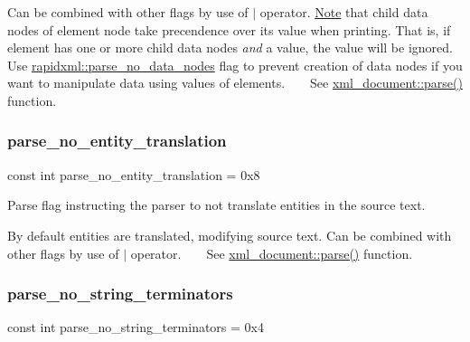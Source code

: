 Can be combined with other flags by use of $\vert$ operator. \mbox{\hyperlink{classNote}{Note}} that child data nodes of element node take precendence over its value when printing. That is, if element has one or more child data nodes {\itshape and} a value, the value will be ignored. Use \mbox{\hyperlink{namespacerapidxml_a87e8bbab53702cf3b438bd553c10b6b9}{rapidxml\+::parse\+\_\+no\+\_\+data\+\_\+nodes}} flag to prevent creation of data nodes if you want to manipulate data using values of elements. ~\newline
~\newline
 See \mbox{\hyperlink{classrapidxml_1_1xml__document_aa280fd704731128b4556b41c1e9182b8}{xml\+\_\+document\+::parse()}} function. \mbox{\label{namespacerapidxml_a7223b7815c4fb8b42e6e4e77e1ea6b97}} 
\subsubsection{\texorpdfstring{parse\+\_\+no\+\_\+entity\+\_\+translation}{parse\_no\_entity\_translation}}
{\footnotesize\ttfamily const int parse\+\_\+no\+\_\+entity\+\_\+translation = 0x8}



Parse flag instructing the parser to not translate entities in the source text. 

By default entities are translated, modifying source text. Can be combined with other flags by use of $\vert$ operator. ~\newline
~\newline
 See \mbox{\hyperlink{classrapidxml_1_1xml__document_aa280fd704731128b4556b41c1e9182b8}{xml\+\_\+document\+::parse()}} function. \mbox{\label{namespacerapidxml_a9cae3801e70437cbc410c24bf6be691c}} 
\subsubsection{\texorpdfstring{parse\+\_\+no\+\_\+string\+\_\+terminators}{parse\_no\_string\_terminators}}
{\footnotesize\ttfamily const int parse\+\_\+no\+\_\+string\+\_\+terminators = 0x4}



